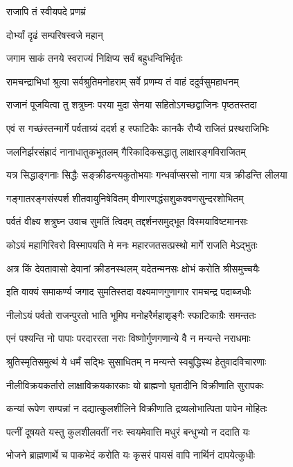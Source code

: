 राजापि तं स्वीयपदे प्रणम्रं

दोर्भ्यां दृढं सम्परिषस्वजे महान्

\twolineshloka
{जगाम साकं तनये स्वराज्यं}
{निक्षिप्य सर्वं बहुधन्विभिर्वृतः}%

\twolineshloka
{रामचन्द्राभिधां श्रुत्वा सर्वश्रुतिमनोहराम्}
{सर्वे प्रणम्य तं वाहं ददुर्वसुमहाधनम्}%

\twolineshloka
{राजानं पूजयित्वा तु शत्रुघ्नः परया मुदा}
{सेनया सहितोऽगच्छद्वाजिनः पृष्ठतस्तदा}%

\twolineshloka
{एवं स गच्छंस्तन्मार्गे पर्वताग्र्यं ददर्श ह}
{स्फाटिकैः कानकै रौप्यै राजितं प्रस्थराजिभिः}%

\twolineshloka
{जलनिर्झरसंह्रादं नानाधातुकभूतलम्}
{गैरिकादिकसद्धातु लाक्षारङ्गविराजितम्}%

\twolineshloka
{यत्र सिद्धाङ्गनाः सिद्धैः सङ्क्रीडन्त्यकुतोभयाः}
{गन्धर्वाप्सरसो नागा यत्र क्रीडन्ति लीलया}%

\twolineshloka
{गङ्गातरङ्गसंस्पर्श शीतवायुनिषेवितम्}
{वीणारणद्धंसशुकक्वणसुन्दरशोभितम्}%

\twolineshloka
{पर्वतं वीक्ष्य शत्रुघ्न उवाच सुमतिं त्विदम्}
{तद्दर्शनसमुद्भूत विस्मयाविष्टमानसः}%

\twolineshloka
{कोऽयं महागिरिवरो विस्मापयति मे मनः}
{महारजतसत्प्रस्थो मार्गे राजति मेऽद्भुतः}%

\twolineshloka
{अत्र किं देवतावासो देवानां क्रीडनस्थलम्}
{यदेतन्मनसः क्षोभं करोति श्रीसमुच्चयैः}%

\twolineshloka
{इति वाक्यं समाकर्ण्य जगाद सुमतिस्तदा}
{वक्ष्यमाणगुणागार रामचन्द्र पदाब्जधीः}%

\twolineshloka
{नीलोऽयं पर्वतो राजन्पुरतो भाति भूमिप}
{मनोहरैर्महाशृङ्गैः स्फाटिकाग्रैः समन्ततः}%

\twolineshloka
{एनं पश्यन्ति नो पापाः परदाररता नराः}
{विष्णोर्गुणगणान्ये वै न मन्यन्ते नराधमाः}%

\twolineshloka
{श्रुतिस्मृतिसमुत्थं ये धर्मं सद्भिः सुसाधितम्}
{न मन्यन्ते स्वबुद्धिस्थ हेतुवादविचारणाः}%

\twolineshloka
{नीलीविक्रयकर्तारो लाक्षाविक्रयकारकाः}
{यो ब्राह्मणो घृतादीनि विक्रीणाति सुरापकः}%

\twolineshloka
{कन्यां रूपेण सम्पन्नां न दद्यात्कुलशीलिने}
{विक्रीणाति द्रव्यलोभात्पिता पापेन मोहितः}%

\twolineshloka
{पत्नीं दूषयते यस्तु कुलशीलवतीं नरः}
{स्वयमेवात्ति मधुरं बन्धुभ्यो न ददाति यः}%

\twolineshloka
{भोजने ब्राह्मणार्थे च पाकभेदं करोति यः}
{कृसरं पायसं वापि नार्थिनं दापयेत्कुधीः}%

